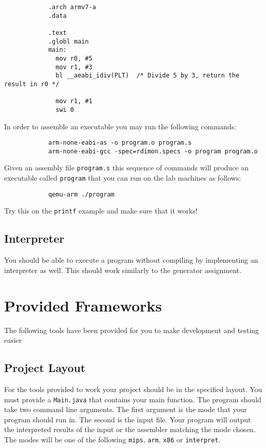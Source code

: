\documentclass{article}
\begin{document}
		\begin{lstlisting}
			.arch armv7-a
			.data

			.text
			.globl main
			main:
			  mov r0, #5
			  mov r1, #3
			  bl __aeabi_idiv(PLT)  /* Divide 5 by 3, return the result in r0 */

			  mov r1, #1
			  swi 0
		\end{lstlisting}

		In order to assemble an executable you may run the following commands:

		\begin{lstlisting}
			arm-none-eabi-as -o program.o program.s
			arm-none-eabi-gcc -spec=rdimon.specs -o program program.o
		\end{lstlisting}

		Given an assembly file \texttt{program.s} this sequence of commands will produce an executable called
		\texttt{program} that you can run on the lab machines as follows:

		\begin{lstlisting}
			qemu-arm ./program
		\end{lstlisting}

		Try this on the \texttt{printf} example and make sure that it works!


	\subsection{Interpreter}

		You should be able to execute a program without compiling by implementing an interpreter as well. This should
		work similarly to the generator assignment.

\section{Provided Frameworks}

	The following tools have been provided for you to make development and testing easier

	\subsection{Project Layout}

		For the tools provided to work your project should be in the specified layout. You must provide a \texttt{Main.java} that contains your main function. The program should take two command line arguments. The first argument is the mode that your program should run in. The second is the input file. Your program will output the interpreted results of the input or the assembler matching the mode chosen. The modes will be one of the following \texttt{mips}, \texttt{arm}, \texttt{x86} or \texttt{interpret}.
\end{document}
